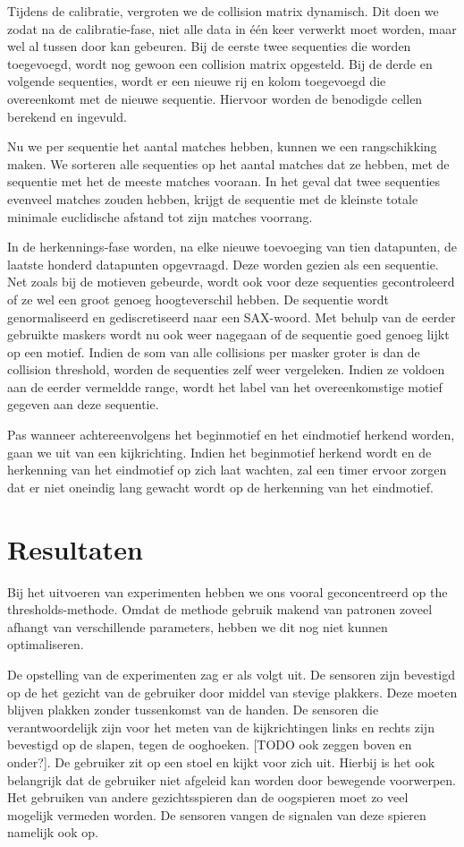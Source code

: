 \documentclass{article}
\begin{document}
Tijdens de calibratie, vergroten we de collision matrix dynamisch. Dit doen we zodat na de calibratie-fase, niet alle data in één keer verwerkt moet worden, maar wel al tussen door kan gebeuren. Bij de eerste twee sequenties die worden toegevoegd, wordt nog gewoon een collision matrix opgesteld. Bij de derde en volgende sequenties, wordt er een nieuwe rij en kolom toegevoegd die overeenkomt met de nieuwe sequentie. Hiervoor worden de benodigde cellen berekend en ingevuld.

Nu we per sequentie het aantal matches hebben, kunnen we een rangschikking maken. We sorteren alle sequenties op het aantal matches dat ze hebben, met de sequentie met het de meeste matches vooraan. In het geval dat twee sequenties evenveel matches zouden hebben, krijgt de sequentie met de kleinste totale minimale euclidische afstand tot zijn matches voorrang.

In de herkennings-fase worden, na elke nieuwe toevoeging van tien datapunten, de laatste honderd datapunten opgevraagd. Deze worden gezien als een sequentie. Net zoals bij de motieven gebeurde, wordt ook voor deze sequenties gecontroleerd of ze wel een groot genoeg hoogteverschil hebben. De sequentie wordt genormaliseerd en gediscretiseerd naar een SAX-woord. Met behulp van de eerder gebruikte maskers wordt nu ook weer nagegaan of de sequentie goed genoeg lijkt op een motief. Indien de som van alle collisions per masker groter is dan de collision threshold, worden de sequenties zelf weer vergeleken. Indien ze voldoen aan de eerder vermeldde range, wordt het label van het overeenkomstige motief gegeven aan deze sequentie.

Pas wanneer achtereenvolgens het beginmotief en het eindmotief herkend worden, gaan we uit van een kijkrichting. Indien het beginmotief herkend wordt en de herkenning van het eindmotief op zich laat wachten, zal een timer ervoor zorgen dat er niet oneindig lang gewacht wordt op de herkenning van het eindmotief.


\section{Resultaten}
Bij het uitvoeren van experimenten hebben we ons vooral geconcentreerd op the thresholds-methode. Omdat de methode gebruik makend van patronen zoveel afhangt van verschillende parameters, hebben we dit nog niet kunnen optimaliseren.

De opstelling van de experimenten zag er als volgt uit. De sensoren zijn bevestigd op de het gezicht van de gebruiker door middel van stevige plakkers. Deze moeten blijven plakken zonder tussenkomst van de handen. De sensoren die verantwoordelijk zijn voor het meten van de kijkrichtingen links en rechts zijn bevestigd op de slapen, tegen de ooghoeken. [TODO ook zeggen boven en onder?]. De gebruiker zit op een stoel en kijkt voor zich uit. Hierbij is het ook belangrijk dat de gebruiker niet afgeleid kan worden door bewegende voorwerpen. Het gebruiken van andere gezichtsspieren dan de oogspieren moet zo veel mogelijk vermeden worden. De sensoren vangen de signalen van deze spieren namelijk ook op.
\end{document}
